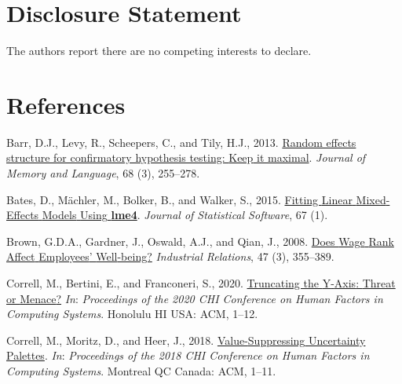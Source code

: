 \documentclass[
]{interact}
\newlength{\cslhangindent}
\newlength{\cslentryspacingunit} %
\newenvironment{CSLReferences}[2] %
 {%
  \setlength{\parindent}{0pt}
  \ifodd #1
  \let\oldpar\par
  \def\par{\hangindent=\cslhangindent\oldpar}
  \fi
  \setlength{\parskip}{#2\cslentryspacingunit}
 }%
 {}
\begin{document}
\hypertarget{disclosure-statement}{%
\section*{Disclosure Statement}\label{disclosure-statement}}

The authors report there are no competing interests to declare.

\newpage{}

\hypertarget{references}{%
\section*{References}\label{references}}

\hypertarget{refs}{}
\begin{CSLReferences}{1}{0}
\leavevmode{}%
Barr, D.J., Levy, R., Scheepers, C., and Tily, H.J., 2013.
\href{https://doi.org/10.1016/j.jml.2012.11.001}{Random effects
structure for confirmatory hypothesis testing: {Keep} it maximal}.
\emph{Journal of Memory and Language}, 68 (3), 255--278.

\leavevmode{}%
Bates, D., Mächler, M., Bolker, B., and Walker, S., 2015.
\href{https://doi.org/10.18637/jss.v067.i01}{Fitting {Linear}
{Mixed}-{Effects} {Models} {Using} \textbf{lme4}}. \emph{Journal of
Statistical Software}, 67 (1).

\leavevmode{}%
Brown, G.D.A., Gardner, J., Oswald, A.J., and Qian, J., 2008.
\href{https://doi.org/10.1111/j.1468-232X.2008.00525.x}{Does {Wage}
{Rank} {Affect} {Employees}' {Well}-being?} \emph{Industrial Relations},
47 (3), 355--389.

\leavevmode{}%
Correll, M., Bertini, E., and Franconeri, S., 2020.
\href{https://doi.org/10.1145/3313831.3376222}{Truncating the
{Y}-{Axis}: {Threat} or {Menace}?} \emph{In}: \emph{Proceedings of the
2020 {CHI} {Conference} on {Human} {Factors} in {Computing} {Systems}}.
Honolulu HI USA: ACM, 1--12.

\leavevmode{}%
Correll, M., Moritz, D., and Heer, J., 2018.
\href{https://doi.org/10.1145/3173574.3174216}{Value-{Suppressing}
{Uncertainty} {Palettes}}. \emph{In}: \emph{Proceedings of the 2018
{CHI} {Conference} on {Human} {Factors} in {Computing} {Systems}}.
Montreal QC Canada: ACM, 1--11.


\end{CSLReferences}
\end{document}
